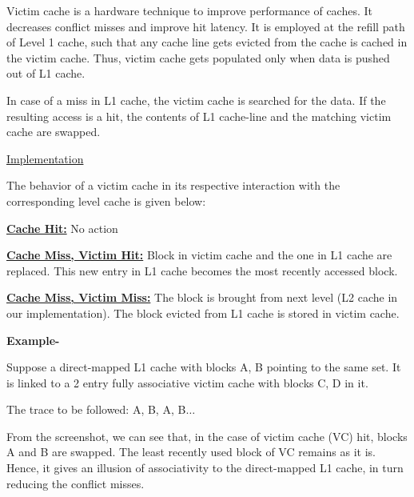 \documentclass[12pt]{article}
\begin{document}
Victim cache is a hardware technique to improve performance of caches. It decreases conflict misses and improve hit latency. It is employed at the refill path of Level 1 cache, such that any cache line gets evicted from the cache is cached in the victim cache. Thus, victim cache gets populated only when data is pushed out of L1 cache.\par

In case of a miss in L1 cache, the victim cache is searched for the data. If the resulting access is a hit, the contents of L1 cache-line and the matching victim cache are swapped.\par

\setlength{\parskip}{3.96pt}
{\fontsize{14pt}{16.8pt}\selectfont \uline{Implementation}\par}\par

\setlength{\parskip}{8.04pt}
The behavior of a victim cache in its respective interaction with the corresponding level cache is given below:\par

\textbf{\uline{Cache Hit:}} No action\par

\textbf{\uline{Cache Miss, Victim Hit:}} Block in victim cache and the one in L1 cache are replaced. This new entry in L1 cache becomes the most recently accessed block.\par

\textbf{\uline{Cache Miss, Victim Miss:}} The block is brought from next level (L2 cache in our implementation). The block evicted from L1 cache is stored in victim cache.\par

\textbf{Example-}\par

\setlength{\parskip}{5.04pt}
Suppose a direct-mapped L1 cache with blocks A, B pointing to the same set. It is linked to a 2 entry fully associative victim cache with blocks C, D in it.\par

The trace to be followed: A, B, A, B$ \ldots $ \par

From the screenshot, we can see that, in the case of victim cache (VC) hit, blocks A and B are swapped. The least recently used block of VC remains as it is. Hence, it gives an illusion of associativity to the direct-mapped L1 cache, in turn reducing the conflict misses.\par
\end{document}
